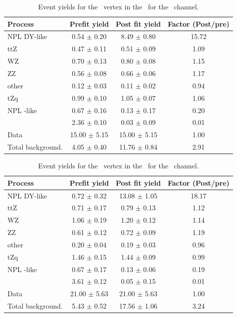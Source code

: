 \begin{table}[htbp]
	\centering
	\caption{Event yields for the \Zct\ vertex in the \STSR\  for the \eee\ channel. }
	\begin{tabular} {l c c c }
		\toprule
		Process & Prefit yield & Post fit yield & Factor (Post/pre) \\
		\midrule
		NPL DY-like & 0.54 $ \pm $ 0.20 & 8.49 $ \pm $ 0.80 & 15.72 \\ 
		ttZ & 0.47 $ \pm $ 0.11 & 0.51 $ \pm $ 0.09 & 1.09 \\ 
		WZ & 0.70 $ \pm $ 0.13 & 0.80 $ \pm $ 0.08 & 1.15 \\ 
		ZZ & 0.56 $ \pm $ 0.08 & 0.66 $ \pm $ 0.06 & 1.17 \\ 
		other & 0.12 $ \pm $ 0.03 & 0.11 $ \pm $ 0.02 & 0.94 \\ 
		tZq & 0.99 $ \pm $ 0.10 & 1.05 $ \pm $ 0.07 & 1.06 \\ 
		NPL \ttbar-like & 0.67 $ \pm $ 0.16 & 0.13 $ \pm $ 0.17 & 0.20\\
		\kZct  & 2.36 $ \pm $ 0.10 & 0.03 $ \pm $ 0.09 & 0.01\\
		\hdashline
		Data & 15.00 $ \pm $ 5.15 & 15.00 $ \pm $ 5.15 & 1.00\\
		Total background. & 4.05 $ \pm $ 0.40 & 11.76 $ \pm $ 0.84 & 2.91\\
		\bottomrule
	\end{tabular}
\end{table}
\begin{table}[htbp]
	\centering
	\caption{Event yields for the \Zct\ vertex in the \STSR\  for the \eemu\ channel. }
	\begin{tabular} {l c c c }
		\toprule
		Process & Prefit yield & Post fit yield & Factor (Post/pre) \\
		\midrule
		NPL DY-like & 0.72 $ \pm $ 0.32 & 13.08 $ \pm $ 1.05 & 18.17 \\ 
		ttZ & 0.71 $ \pm $ 0.17 & 0.79 $ \pm $ 0.13 & 1.12 \\ 
		WZ & 1.06 $ \pm $ 0.19 & 1.20 $ \pm $ 0.12 & 1.14 \\ 
		ZZ & 0.61 $ \pm $ 0.12 & 0.72 $ \pm $ 0.09 & 1.19 \\ 
		other & 0.20 $ \pm $ 0.04 & 0.19 $ \pm $ 0.03 & 0.96 \\ 
		tZq & 1.46 $ \pm $ 0.15 & 1.44 $ \pm $ 0.09 & 0.99 \\ 
		NPL \ttbar-like & 0.67 $ \pm $ 0.17 & 0.13 $ \pm $ 0.06 & 0.19\\
		\kZct  & 3.61 $ \pm $ 0.12 & 0.05 $ \pm $ 0.15 & 0.01\\
		\hdashline
		Data & 21.00 $ \pm $ 5.63 & 21.00 $ \pm $ 5.63 & 1.00\\
		Total background. & 5.43 $ \pm $ 0.52 & 17.56 $ \pm $ 1.06 & 3.24\\
		\bottomrule
	\end{tabular}
\end{table}
